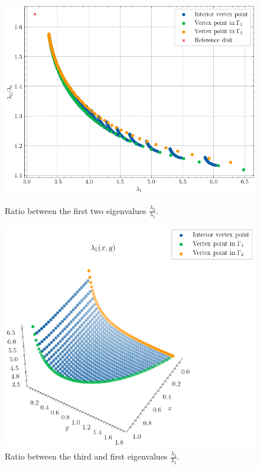 \begin{figure}[!htb]
    \begin{minipage}[c]{0.41\textwidth}
        \centering
        \includegraphics[width=\textwidth]{Images/Dirac/triangles/triangle_benguria.png}
        \captionsetup{width=0.8\linewidth} %
        \caption{Ratio between the first two eigenvalues \(\frac{\lambda_2}{\lambda_1}\).}
        \label{dirac_triangle_benguria}
    \end{minipage}
    \hfill
    \begin{minipage}[c]{0.50\textwidth}
        \centering
        \includegraphics[width=\textwidth]{Images/Dirac/triangles/triangle_3d_lambda1.png}
        \captionsetup{width=0.8\linewidth} %
        \caption{Ratio between the third and first eigenvalues \(\frac{\lambda_2}{\lambda_1}\).}
        \label{dirac_triangle_3d_lambda1}
    \end{minipage}
    \vspace{0.5cm}
\end{figure}

